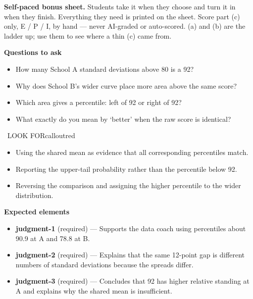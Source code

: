 \documentclass[11pt]{article}
\begin{document}
\textbf{Self-paced bonus sheet.} Students take it when they choose and turn it in when they finish. Everything they need is printed on the sheet. Score part (c) only, E / P / I, by hand --- never AI-graded or auto-scored. (a) and (b) are the ladder up; use them to see where a thin (c) came from.\par

\textbf{Questions to ask}
\begin{itemize}[leftmargin=1.5em,itemsep=2pt,topsep=2pt]
  \item How many School A standard deviations above 80 is a 92?
  \item Why does School B's wider curve place more area above the same score?
  \item Which area gives a percentile: left of 92 or right of 92?
  \item What exactly do you mean by `better' when the raw score is identical?
\end{itemize}

\begin{callout}{\IconWarn\ LOOK FOR}{calloutred}
\begin{itemize}[leftmargin=1.5em,itemsep=2pt,topsep=2pt]
  \item Using the shared mean as evidence that all corresponding percentiles match.
  \item Reporting the upper-tail probability rather than the percentile below 92.
  \item Reversing the comparison and assigning the higher percentile to the wider distribution.
\end{itemize}
\end{callout}


\textbf{Expected elements}
\begin{itemize}[leftmargin=1.5em,itemsep=2pt,topsep=2pt]
  \item \textbf{judgment-1} (required) --- Supports the data coach using percentiles about 90.9 at A and 78.8 at B.
  \item \textbf{judgment-2} (required) --- Explains that the same 12-point gap is different numbers of standard deviations because the spreads differ.
  \item \textbf{judgment-3} (required) --- Concludes that 92 has higher relative standing at A and explains why the shared mean is insufficient.
\end{itemize}
\end{document}
